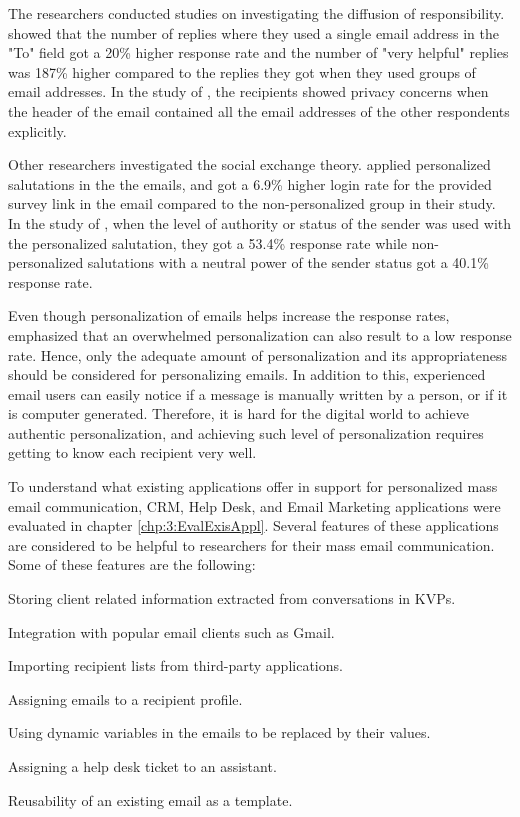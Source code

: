 The researchers conducted studies on investigating the diffusion of responsibility. \cite{Barron2002} showed that the number of replies where they used a single email address in the "To" field got a 20\% higher response rate and the number of "very helpful" replies was 187\% higher compared to the replies they got when they used groups of email addresses. In the study of \cite{Selm2006}, the recipients showed privacy concerns when the header of the email contained all the email addresses of the other respondents explicitly.
\vspace{1cm}

Other researchers investigated the social exchange theory. \cite{Heerwegh2005} applied personalized salutations in the the emails, and got a 6.9\% higher login rate for the provided survey link in the email compared to the non-personalized group in their study. In the study of \cite{Joinson2007}, when the level of authority or status of the sender was used with the personalized salutation, they got a 53.4\% response rate while non-personalized salutations with a neutral power of the sender status got a 40.1\% response rate.
\vspace{1cm}

Even though personalization of emails helps increase the response rates, \cite{DillmanDonA.SmythJoleneD.Christian2009} emphasized that an overwhelmed personalization can also result to a low response rate. Hence, only the adequate amount of personalization and its appropriateness should be considered for personalizing emails. In addition to this, experienced email users can easily notice if a message is manually written by a person, or if it is computer generated. Therefore, it is hard for the digital world to achieve authentic personalization, and achieving such level of personalization requires getting to know each recipient very well.
\vspace{1cm}

To understand what existing applications offer in support for personalized mass email communication, \ac{CRM}, Help Desk, and Email Marketing applications were evaluated in chapter \ref{chp:3:EvalExisAppl}. Several features of these applications are considered to be helpful to researchers for their mass email communication. Some of these features are the following:

\begin{compactitem}
	\item Storing client related information extracted from conversations in \ac{KVP}s.
	\item Integration with popular email clients such as Gmail.
	\item Importing recipient lists from third-party applications.
	\item Assigning emails to a recipient profile.
	\item Using dynamic variables in the emails to be replaced by their values.
	\item Assigning a help desk ticket to an assistant.
	\item Reusability of an existing email as a template.
\end{compactitem}
\vspace{1cm}

